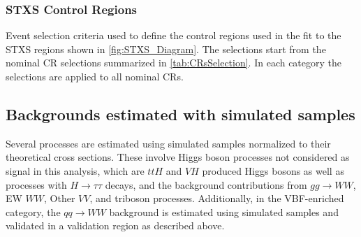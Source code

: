 \subsubsection{STXS Control Regions}
\label{subsubsec:stxs-crs}

\begin{table}[ht]
    \caption{
      Event selection criteria used to define the control regions used in the fit to the STXS regions shown in \cref{fig:STXS_Diagram}.
      The selections start from the nominal CR selections summarized in \cref{tab:CRsSelection}.
      In each category the selections are applied to all nominal CRs. 
      }
  \label{tab:STXSCRsSelection}
  \centering
  \scalebox{0.75}{
  
  }
  \end{table}


\subsection{Backgrounds estimated with simulated samples}
Several processes are estimated using simulated samples normalized to their theoretical cross sections. These involve Higgs boson processes not considered as signal in this analysis, which are $ttH$ and $VH$ produced Higgs bosons as well as processes with $H\to\tau\tau$ decays, and the background contributions from $gg \to WW$, EW $WW$, Other $VV$, and triboson processes. Additionally, in the VBF-enriched \TwoJet category, the $qq \to WW$ background is estimated using simulated samples and validated in a validation region as described above.

